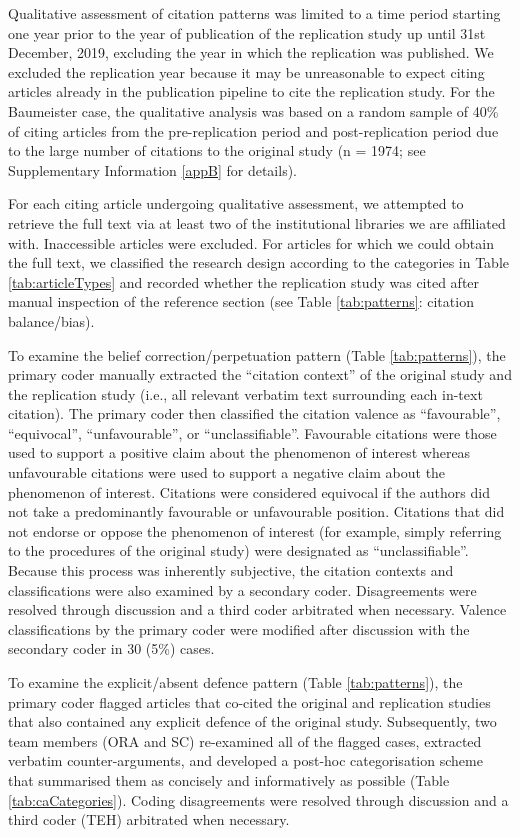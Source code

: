 \documentclass[
  american,
  ,man,floatsintext]{apa6}
\begin{document}
Qualitative assessment of citation patterns was limited to a time period starting one year prior to the year of publication of the replication study up until 31st December, 2019, excluding the year in which the replication was published. We excluded the replication year because it may be unreasonable to expect citing articles already in the publication pipeline to cite the replication study. For the Baumeister case, the qualitative analysis was based on a random sample of 40\% of citing articles from the pre-replication period and post-replication period due to the large number of citations to the original study (n = 1974; see Supplementary Information \ref{appB} for details).

For each citing article undergoing qualitative assessment, we attempted to retrieve the full text via at least two of the institutional libraries we are affiliated with. Inaccessible articles were excluded. For articles for which we could obtain the full text, we classified the research design according to the categories in Table \ref{tab:articleTypes} and recorded whether the replication study was cited after manual inspection of the reference section (see Table \ref{tab:patterns}: citation balance/bias).

To examine the belief correction/perpetuation pattern (Table \ref{tab:patterns}), the primary coder manually extracted the \enquote{citation context} of the original study and the replication study (i.e., all relevant verbatim text surrounding each in-text citation). The primary coder then classified the citation valence as \enquote{favourable}, \enquote{equivocal}, \enquote{unfavourable}, or \enquote{unclassifiable}. Favourable citations were those used to support a positive claim about the phenomenon of interest whereas unfavourable citations were used to support a negative claim about the phenomenon of interest. Citations were considered equivocal if the authors did not take a predominantly favourable or unfavourable position. Citations that did not endorse or oppose the phenomenon of interest (for example, simply referring to the procedures of the original study) were designated as \enquote{unclassifiable}. Because this process was inherently subjective, the citation contexts and classifications were also examined by a secondary coder. Disagreements were resolved through discussion and a third coder arbitrated when necessary. Valence classifications by the primary coder were modified after discussion with the secondary coder in 30 (5\%) cases.

To examine the explicit/absent defence pattern (Table \ref{tab:patterns}), the primary coder flagged articles that co-cited the original and replication studies that also contained any explicit defence of the original study. Subsequently, two team members (ORA and SC) re-examined all of the flagged cases, extracted verbatim counter-arguments, and developed a post-hoc categorisation scheme that summarised them as concisely and informatively as possible (Table \ref{tab:caCategories}). Coding disagreements were resolved through discussion and a third coder (TEH) arbitrated when necessary.
\end{document}
